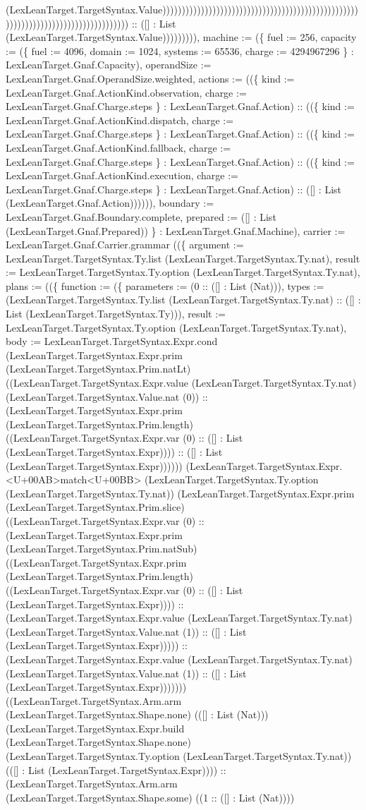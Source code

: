 \documentclass[11pt]{article}
\begin{document}
(LexLeanTarget.TargetSyntax.Value))))))))))))))))))))))))))))))))))))))))))))))))))))))))))))))))))))))))))))))))))) :: ([] : List (LexLeanTarget.TargetSyntax.Value))))))))), machine := (\{ fuel := 256, capacity := (\{ fuel := 4096, domain := 1024, systems := 65536, charge := 4294967296 \} : LexLeanTarget.Gnaf.Capacity), operandSize := LexLeanTarget.Gnaf.OperandSize.weighted, actions := ((\{ kind := LexLeanTarget.Gnaf.ActionKind.observation, charge := LexLeanTarget.Gnaf.Charge.steps \} : LexLeanTarget.Gnaf.Action) :: ((\{ kind := LexLeanTarget.Gnaf.ActionKind.dispatch, charge := LexLeanTarget.Gnaf.Charge.steps \} : LexLeanTarget.Gnaf.Action) :: ((\{ kind := LexLeanTarget.Gnaf.ActionKind.fallback, charge := LexLeanTarget.Gnaf.Charge.steps \} : LexLeanTarget.Gnaf.Action) :: ((\{ kind := LexLeanTarget.Gnaf.ActionKind.execution, charge := LexLeanTarget.Gnaf.Charge.steps \} : LexLeanTarget.Gnaf.Action) :: ([] : List (LexLeanTarget.Gnaf.Action)))))), boundary := LexLeanTarget.Gnaf.Boundary.complete, prepared := ([] : List (LexLeanTarget.Gnaf.Prepared)) \} : LexLeanTarget.Gnaf.Machine), carrier := LexLeanTarget.Gnaf.Carrier.grammar ((\{ argument := LexLeanTarget.TargetSyntax.Ty.list (LexLeanTarget.TargetSyntax.Ty.nat), result := LexLeanTarget.TargetSyntax.Ty.option (LexLeanTarget.TargetSyntax.Ty.nat), plans := ((\{ function := (\{ parameters := (0 :: ([] : List (Nat))), types := (LexLeanTarget.TargetSyntax.Ty.list (LexLeanTarget.TargetSyntax.Ty.nat) :: ([] : List (LexLeanTarget.TargetSyntax.Ty))), result := LexLeanTarget.TargetSyntax.Ty.option (LexLeanTarget.TargetSyntax.Ty.nat), body := LexLeanTarget.TargetSyntax.Expr.cond (LexLeanTarget.TargetSyntax.Expr.prim (LexLeanTarget.TargetSyntax.Prim.natLt) ((LexLeanTarget.TargetSyntax.Expr.value (LexLeanTarget.TargetSyntax.Ty.nat) (LexLeanTarget.TargetSyntax.Value.nat (0)) :: (LexLeanTarget.TargetSyntax.Expr.prim (LexLeanTarget.TargetSyntax.Prim.length) ((LexLeanTarget.TargetSyntax.Expr.var (0) :: ([] : List (LexLeanTarget.TargetSyntax.Expr)))) :: ([] : List (LexLeanTarget.TargetSyntax.Expr)))))) (LexLeanTarget.TargetSyntax.Expr.<U+00AB>match<U+00BB> (LexLeanTarget.TargetSyntax.Ty.option (LexLeanTarget.TargetSyntax.Ty.nat)) (LexLeanTarget.TargetSyntax.Expr.prim (LexLeanTarget.TargetSyntax.Prim.slice) ((LexLeanTarget.TargetSyntax.Expr.var (0) :: (LexLeanTarget.TargetSyntax.Expr.prim (LexLeanTarget.TargetSyntax.Prim.natSub) ((LexLeanTarget.TargetSyntax.Expr.prim (LexLeanTarget.TargetSyntax.Prim.length) ((LexLeanTarget.TargetSyntax.Expr.var (0) :: ([] : List (LexLeanTarget.TargetSyntax.Expr)))) :: (LexLeanTarget.TargetSyntax.Expr.value (LexLeanTarget.TargetSyntax.Ty.nat) (LexLeanTarget.TargetSyntax.Value.nat (1)) :: ([] : List (LexLeanTarget.TargetSyntax.Expr))))) :: (LexLeanTarget.TargetSyntax.Expr.value (LexLeanTarget.TargetSyntax.Ty.nat) (LexLeanTarget.TargetSyntax.Value.nat (1)) :: ([] : List (LexLeanTarget.TargetSyntax.Expr))))))) ((LexLeanTarget.TargetSyntax.Arm.arm (LexLeanTarget.TargetSyntax.Shape.none) (([] : List (Nat))) (LexLeanTarget.TargetSyntax.Expr.build (LexLeanTarget.TargetSyntax.Shape.none) (LexLeanTarget.TargetSyntax.Ty.option (LexLeanTarget.TargetSyntax.Ty.nat)) (([] : List (LexLeanTarget.TargetSyntax.Expr)))) :: (LexLeanTarget.TargetSyntax.Arm.arm (LexLeanTarget.TargetSyntax.Shape.some) ((1 :: ([] : List (Nat)))) 
\end{document}
